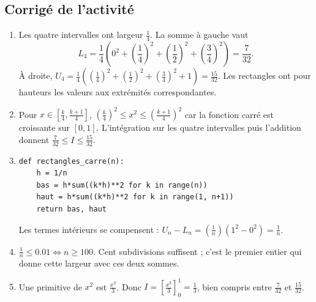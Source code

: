 \subsection{Corrigé de l'activité}\begin{enumerate}
\item Les quatre intervalles ont largeur $\frac{1}{4}$. La somme à gauche vaut
\[L_4=\frac{1}{4}(0^2+(\frac{1}{4})^2+(\frac{1}{2})^2+(\frac{3}{4})^2)=\frac{7}{32}.\]
À droite, $U_4=\frac{1}{4}((\frac{1}{4})^2+(\frac{1}{2})^2+(\frac{3}{4})^2+1)=\frac{15}{32}$. Les rectangles ont pour hauteurs les valeurs aux extrémités correspondantes.
\item Pour $x\in[\frac{k}{4},\frac{k+1}{4}]$, $(\frac{k}{4})^2\le x^2\le(\frac{k+1}{4})^2$ car la fonction carré est croissante sur $[0,1]$. L'intégration sur les quatre intervalles puis l'addition donnent $\frac{7}{32}\le I\le\frac{15}{32}$.
\item 
\begin{lstlisting}
def rectangles_carre(n):
    h = 1/n
    bas = h*sum((k*h)**2 for k in range(n))
    haut = h*sum((k*h)**2 for k in range(1, n+1))
    return bas, haut
\end{lstlisting}
Les termes intérieurs se compensent : $U_n-L_n=(\frac{1}{n})(1^2-0^2)=\frac{1}{n}$.
\item $\frac{1}{n}\le\num{0,01}\Longleftrightarrow n\ge100$. Cent subdivisions suffisent ; c'est le premier entier qui donne cette largeur avec ces deux sommes.
\item Une primitive de $x^2$ est $\frac{x^3}{3}$. Donc $I=[\frac{x^3}{3}]_0^1=\frac{1}{3}$, bien compris entre $\frac{7}{32}$ et $\frac{15}{32}$.
\end{enumerate}

